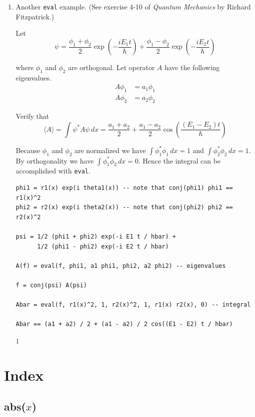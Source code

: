 \documentclass[12pt]{article}
\begin{document}
\begin{enumerate}
\item
Another \verb$eval$ example.
(See exercise 4-10 of {\it Quantum Mechanics} by Richard Fitzpatrick.)

\bigskip
Let
\begin{equation*}
\psi
=\frac{\phi_1+\phi_2}{2}\exp\left(-\frac{iE_1t}{\hbar}\right)
+\frac{\phi_1-\phi_2}{2}\exp\left(-\frac{iE_2t}{\hbar}\right)
\end{equation*}

where $\phi_1$ and $\phi_2$ are orthogonal.
Let operator $A$ have the following eigenvalues.
\begin{align*}
A\phi_1&=a_1\phi_1
\\
A\phi_2&=a_2\phi_2
\end{align*}

Verify that
\begin{equation*}
\langle A\rangle
=\int\psi^*A\psi\,dx
=\frac{a_1+a_2}{2}+\frac{a_1-a_2}{2}\cos\left(\frac{(E_1-E_2)t}{\hbar}\right)
\end{equation*}

Because $\phi_1$ and $\phi_2$ are normalized we have
$\int\phi_1^*\phi_1\,dx=1$ and $\int\phi_2^*\phi_2\,dx=1$.
By orthogonality we have $\int\phi_1^*\phi_2\,dx=0$.
Hence the integral can be accomplished with \verb$eval$.

{\color{blue}
\begin{verbatim}
phi1 = r1(x) exp(i theta1(x)) -- note that conj(phi1) phi1 == r1(x)^2
phi2 = r2(x) exp(i theta2(x)) -- note that conj(phi2) phi2 == r2(x)^2

psi = 1/2 (phi1 + phi2) exp(-i E1 t / hbar) +
      1/2 (phi1 - phi2) exp(-i E2 t / hbar)

A(f) = eval(f, phi1, a1 phi1, phi2, a2 phi2) -- eigenvalues

f = conj(psi) A(psi)

Abar = eval(f, r1(x)^2, 1, r2(x)^2, 1, r1(x) r2(x), 0) -- integral

Abar == (a1 + a2) / 2 + (a1 - a2) / 2 cos((E1 - E2) t / hbar)
\end{verbatim}}

$1$

\end{enumerate}
\newpage

\section{Index}

\subsection*{abs($x$)}
\end{document}
